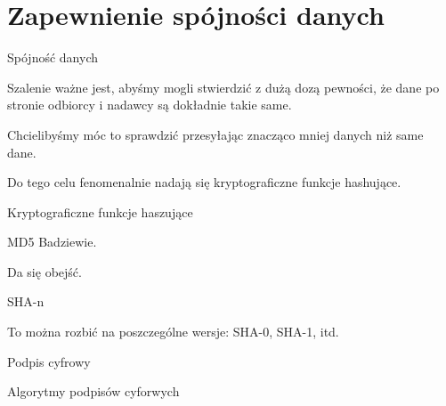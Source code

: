 \section{Zapewnienie spójności danych}

\begin{frame}{Spójność danych}
	
	Szalenie ważne jest, abyśmy mogli stwierdzić z dużą dozą pewności, że dane po stronie odbiorcy i nadawcy są dokładnie takie same.
	
	Chcielibyśmy móc to sprawdzić przesyłając znacząco mniej danych niż same dane.
	
	Do tego celu fenomenalnie nadają się kryptograficzne funkcje hashujące.

\end{frame}

\begin{frame}{Kryptograficzne funkcje haszujące}
	
\end{frame}

\begin{frame}{MD5}
	Badziewie.
	
	Da się obejść.
\end{frame}

\begin{frame}{SHA-n}
	
	To można rozbić na poszczególne wersje: SHA-0, SHA-1, itd.
\end{frame}


\begin{frame}{Podpis cyfrowy}
	
\end{frame}

\begin{frame}{Algorytmy podpisów cyforwych}
	
\end{frame}